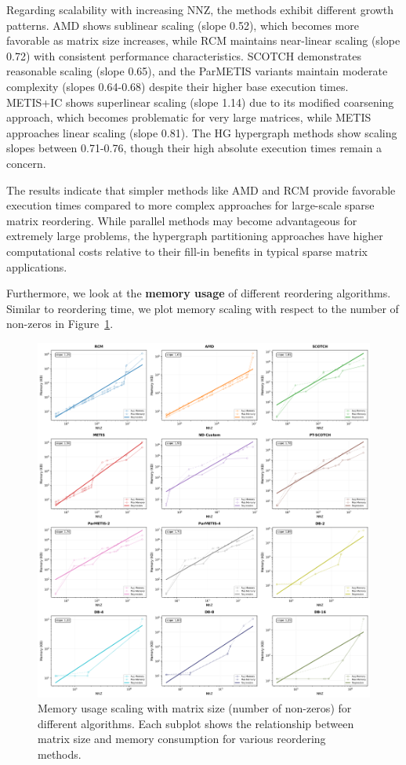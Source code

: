 Regarding scalability with increasing NNZ, the methods exhibit different growth patterns. AMD shows sublinear scaling (slope 0.52), which becomes more favorable as matrix size increases, while RCM maintains near-linear scaling (slope 0.72) with consistent performance characteristics. SCOTCH demonstrates reasonable scaling (slope 0.65), and the ParMETIS variants maintain moderate complexity (slopes 0.64-0.68) despite their higher base execution times. METIS+IC shows superlinear scaling (slope 1.14) due to its modified coarsening approach, which becomes problematic for very large matrices, while METIS approaches linear scaling (slope 0.81). The HG hypergraph methods show scaling slopes between 0.71-0.76, though their high absolute execution times remain a concern.

The results indicate that simpler methods like AMD and RCM provide favorable execution times compared to more complex approaches for large-scale sparse matrix reordering. While parallel methods may become advantageous for extremely large problems, the hypergraph partitioning approaches have higher computational costs relative to their fill-in benefits in typical sparse matrix applications.

Furthermore, we look at the \textbf{memory usage} of different reordering algorithms. Similar to reordering time, we plot memory scaling with respect to the number of non-zeros in Figure~\ref{fig:memory-scaling}.

\begin{figure}[H]
\centering
\includegraphics[width=\textwidth]{fig/res/reorder_memory_scaling.png}
\caption{Memory usage scaling with matrix size (number of non-zeros) for different algorithms. Each subplot shows the relationship between matrix size and memory consumption for various reordering methods.}
\label{fig:memory-scaling}
\end{figure}

